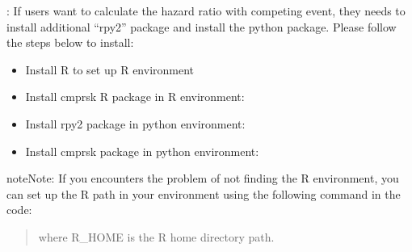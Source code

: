\documentclass[letterpaper,10pt,english]{sphinxmanual}
\begin{document}
\sphinxAtStartPar
{}: If users want to calculate the hazard ratio with competing event, they needs to install additional “rpy2” package
and install the python  package. Please follow the steps below to install:
\begin{itemize}
\item {} 
\sphinxAtStartPar
Install R to set up R environment

\item {} 
\sphinxAtStartPar
Install cmprsk R package in R environment:

\begin{sphinxVerbatim}[commandchars=\\\{\}]
\end{sphinxVerbatim}

\item {} 
\sphinxAtStartPar
Install rpy2 package in python environment:

\begin{sphinxVerbatim}[commandchars=\\\{\}]
  
\end{sphinxVerbatim}

\item {} 
\sphinxAtStartPar
Install cmprsk package in python environment:

\begin{sphinxVerbatim}[commandchars=\\\{\}]
  
\end{sphinxVerbatim}

\end{itemize}

\begin{sphinxadmonition}{note}{Note:}
\sphinxAtStartPar
If you encounters the problem of not finding the R environment, you can set up the R path
in your environment using the following command in the code:
\begin{quote}

\begin{sphinxVerbatim}[commandchars=\\\{\}]
 
\PYG{p}{[}\PYG{p}{]}  
\end{sphinxVerbatim}

\sphinxAtStartPar
where R\_HOME is the R home directory path.
\end{quote}
\end{sphinxadmonition}
\end{document}
